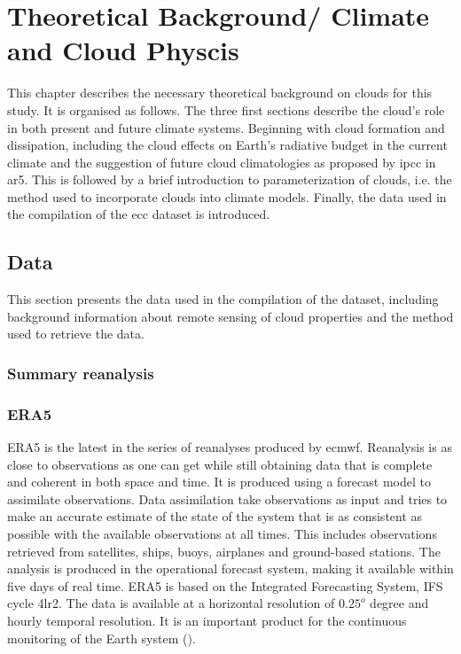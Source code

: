 \setcounter{chapter}{1} 
\chapter{Theoretical Background/ Climate and Cloud Physcis} \label{ch:theoretical_back}
This chapter describes the necessary theoretical background on clouds for this study. It is organised as follows. The three first sections describe the cloud's role in both present and future climate systems. Beginning with cloud formation and dissipation, including the cloud effects on Earth's radiative budget in the current climate and the suggestion of future cloud climatologies as proposed by \acrshort{ipcc} in \acrshort{ar5}. This is followed by a brief introduction to parameterization of clouds, i.e. the method used to incorporate clouds into climate models.
Finally, the data used in the compilation of the \acrshort{ecc} dataset is introduced. 





\section{Data}
This section presents the data used in the compilation of the dataset, including background information about remote sensing of cloud properties and the method used to retrieve the data. 

\subsection{Summary reanalysis} \label{sec:summary_reanalysis}
\cite{Fujiwara2017IntroductionSystems}

\subsection{ERA5} \label{sec:era5}
ERA5 is the latest in the series of reanalyses produced by \acrfull{ecmwf}. Reanalysis is as close to observations as one can get while still obtaining data that is complete and coherent in both space and time. It is produced using a forecast model to assimilate observations. Data assimilation take observations as input and tries to make an accurate estimate of the state of the system that is as consistent as possible with the available observations at all times. This includes observations retrieved from satellites, ships, buoys, airplanes and ground-based stations. The analysis is produced in the operational forecast system, making it available within five days of real time. ERA5 is based on the Integrated Forecasting System, IFS cycle 4lr2. The data is available at a horizontal resolution of $0.25^o$ degree and hourly temporal resolution. It is an important product for the continuous monitoring of the Earth system 
(\cite{Hersbach2018OperationalStatus}).

